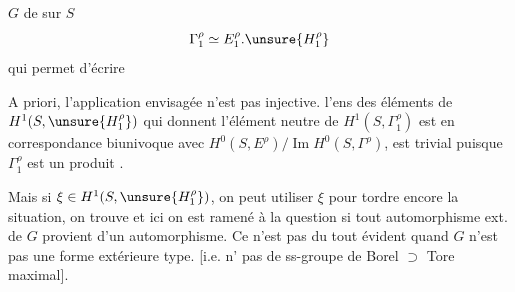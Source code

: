  $G$  de  sur $S$
\[
\Gamma_1^\rho\simeq E_1^\rho.\unsure{H_1^\rho}
\]
qui permet d'écrire

A priori, l'application envisagée n'est pas injective.  l'ens des éléments de $H^1(S,\unsure{H_1^\rho})$ qui donnent l'élément neutre de $H^1(S,\Gamma_1^\rho)$  est en correspondance biunivoque avec $H^0(S,E^\rho)/\operatorname{Im}H^0(S,\Gamma^\rho)$, est trivial puisque $\Gamma_1^\rho$ est un produit .

Mais si $\xi\in H^1(S,\unsure{H_1^\rho})$, on peut utiliser $\xi$ pour tordre encore la situation, on trouve
et ici on est ramené à la question si tout automorphisme ext. de $G$ provient d'un automorphisme. Ce n'est pas du tout évident quand $G$ n'est  pas une forme extérieure type. [i.e.  n' pas de ss-groupe de Borel $\supset$ Tore maximal].

